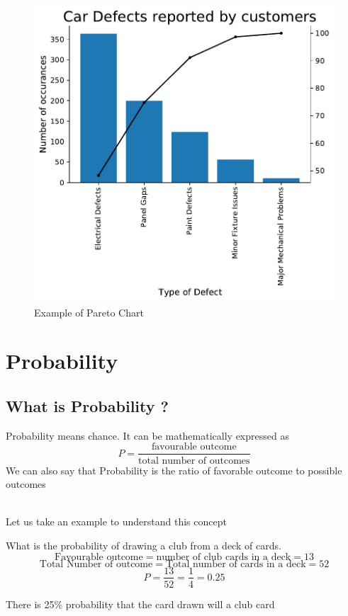 \documentclass[twoside,12pt]{report}  %
\begin{document}
\begin{tcolorbox}[colback=blue!5!white, colframe=blue!75!black, title = \textbf{Pareto Chart}]
	\begin{figure}[H]
		\centering
		\includegraphics[width=0.5\linewidth]{./images/paretochart_example.pdf}
		\caption{Example of Pareto Chart}
		\label{paretochart_example}
	\end{figure}

\end{tcolorbox}


\chapter{Probability}

\section{What is Probability ?}

\begin{tcolorbox}[colback=red!5!white, colframe=red!75!black, title = \textbf{Probability}]
	Probability means chance. It can be mathematically expressed as
	$$ P = \frac{\mbox{favourable outcome}}{\mbox{total number of outcomes}} $$
	We can also say that Probability is the ratio of favorable outcome to possible outcomes
\end{tcolorbox}
\noindent
\\
Let us take an example to understand this concept

\begin{tcolorbox}[colback=blue!5!white, colframe=blue!75!black, title = \textbf{Probability}]
	What is the probability of drawing a club from a deck of cards.
	$$\mbox{Favourable outcome} = \mbox{number of club cards in a deck} = 13$$
	$$\mbox{Total Number of outcome} = \mbox{Total number of cards in a deck} = 52$$
	$$ P = \frac{13}{52} = \frac{1}{4} = 0.25$$
	
	There is 25\% probability that the card drawn will a club card
\end{tcolorbox}
\end{document}
